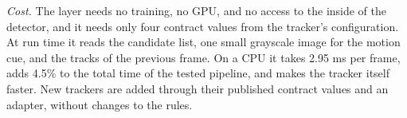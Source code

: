\emph{Cost.} The layer needs no training, no GPU, and no access to the inside
of the detector, and it needs only four contract values from the tracker's
configuration. At run time it reads the candidate list, one small grayscale
image for the motion cue, and the tracks of the previous frame. On a CPU it
takes 2.95 ms per frame, adds 4.5\% to the total time of the tested pipeline,
and makes the tracker itself faster. New trackers are added through their
published contract values and an adapter, without changes to the rules.
